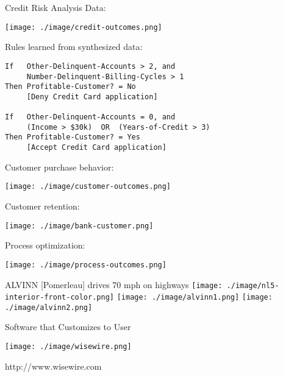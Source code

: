 \documentclass[presentation]{beamer}
\begin{document}
\begin{frame}[label={sec:orgb1806ba},fragile]{Credit Risk Analysis}
 Data:

\begin{center}
\texttt{[image: ./image/credit-outcomes.png]}
\end{center}

Rules learned from synthesized data:

\begin{verbatim}
If   Other-Delinquent-Accounts > 2, and
     Number-Delinquent-Billing-Cycles > 1
Then Profitable-Customer? = No
     [Deny Credit Card application]

If   Other-Delinquent-Accounts = 0, and
     (Income > $30k)  OR  (Years-of-Credit > 3)
Then Profitable-Customer? = Yes
     [Accept Credit Card application]
\end{verbatim}
\end{frame}
\begin{frame}[label={sec:orga61d63a}]{Customer purchase behavior:}
\begin{center}
\texttt{[image: ./image/customer-outcomes.png]}
\end{center}
\end{frame}

\begin{frame}[label={sec:org52ff09e}]{Customer retention:}
\begin{center}
\texttt{[image: ./image/bank-customer.png]}
\end{center}
\end{frame}

\begin{frame}[label={sec:org1dc17d3}]{Process optimization:}
\begin{center}
\texttt{[image: ./image/process-outcomes.png]}
\end{center}
\end{frame}

\begin{frame}[label={sec:orgae5b8c4}]{ALVINN [Pomerleau] drives 70 mph on highways}
\texttt{[image: ./image/nl5-interior-front-color.png]}
\texttt{[image: ./image/alvinn1.png]}
\texttt{[image: ./image/alvinn2.png]}
\end{frame}


\begin{frame}[label={sec:org37207d8}]{Software that Customizes to User}
\center
\begin{center}
\texttt{[image: ./image/wisewire.png]}
\end{center}

\centerline{http://www.wisewire.com}
\end{frame}
\end{document}
